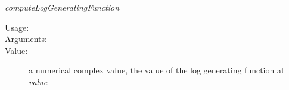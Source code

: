 \begin{description}
\begin{description}
\item \textit{computeLogGeneratingFunction}
\begin{description}
\item[Usage:] \rule{0pt}{1em}
\item[Arguments:] \rule{0pt}{1em}
\item[Value:]  a numerical complex value, the value of the log generating function at \textit{value}
\end{description}
\bigskip


\end{description}
\end{description}
